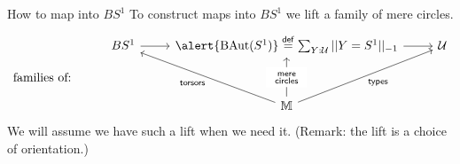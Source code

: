 \begin{frame}{How to map into \( BS^1 \)}
To construct maps into \( BS^1 \) we \alert{lift} a family of \alert{mere circles}.
\[\begin{tikzcd}[ampersand replacement=\&, row sep=small]
  \& {BS^1} \& {\alert{\BAut (S^1)}\stackrel{\mathrm{def}}{=}\sum_{Y:\uni}||Y=S^1||_{-1}} \& \uni \\
  {\text{families of:}} \\
  \&\& \mm
  \arrow[from=1-2, to=1-3]
  \arrow[from=1-3, to=1-4]
  \arrow["{\mathrm{torsors}}", from=3-3, to=1-2]
  \arrow["\begin{array}{c} \substack{\mathrm{mere}\\ \mathrm{circles}} \end{array}"{description}, from=3-3, to=1-3]
  \arrow["{\mathrm{types}}"', from=3-3, to=1-4]
\end{tikzcd}\]
We will assume we have such a lift when we need it. (Remark: the lift is a choice of \alert{orientation}.)

\end{frame}


